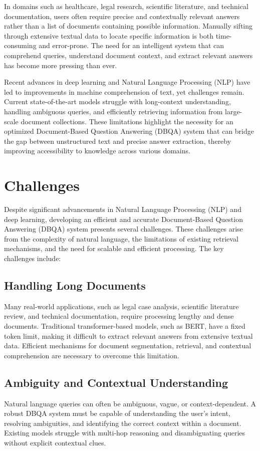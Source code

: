 \documentclass[sigconf]{acmart}
\begin{document}
In domains such as healthcare, legal research, scientific literature, and technical documentation, users often require precise and contextually relevant answers rather than a list of documents containing possible information. Manually sifting through extensive textual data to locate specific information is both time-consuming and error-prone. The need for an intelligent system that can comprehend queries, understand document context, and extract relevant answers has become more pressing than ever.

Recent advances in deep learning and Natural Language Processing (NLP) have led to improvements in machine comprehension of text, yet challenges remain. Current state-of-the-art models struggle with long-context understanding, handling ambiguous queries, and efficiently retrieving information from large-scale document collections. These limitations highlight the necessity for an optimized Document-Based Question Answering (DBQA) system that can bridge the gap between unstructured text and precise answer extraction, thereby improving accessibility to knowledge across various domains.

\section{Challenges}
Despite significant advancements in Natural Language Processing (NLP) and deep learning, developing an efficient and accurate Document-Based Question Answering (DBQA) system presents several challenges. These challenges arise from the complexity of natural language, the limitations of existing retrieval mechanisms, and the need for scalable and efficient processing. The key challenges include:

\subsection{Handling Long Documents}
Many real-world applications, such as legal case analysis, scientific literature review, and technical documentation, require processing lengthy and dense documents. Traditional transformer-based models, such as BERT, have a fixed token limit, making it difficult to extract relevant answers from extensive textual data. Efficient mechanisms for document segmentation, retrieval, and contextual comprehension are necessary to overcome this limitation.

\subsection{Ambiguity and Contextual Understanding}
Natural language queries can often be ambiguous, vague, or context-dependent. A robust DBQA system must be capable of understanding the user’s intent, resolving ambiguities, and identifying the correct context within a document. Existing models struggle with multi-hop reasoning and disambiguating queries without explicit contextual clues.
\end{document}
